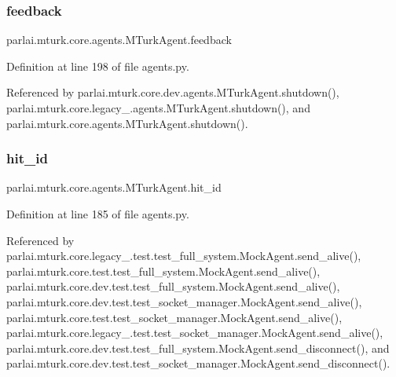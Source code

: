 \mbox{\label{classparlai_1_1mturk_1_1core_1_1agents_1_1MTurkAgent_afc4c17ac00ca8efec5cc2cb6aea88765}} 
\subsubsection{\texorpdfstring{feedback}{feedback}}
{\footnotesize\ttfamily parlai.\+mturk.\+core.\+agents.\+M\+Turk\+Agent.\+feedback}



Definition at line 198 of file agents.\+py.



Referenced by parlai.\+mturk.\+core.\+dev.\+agents.\+M\+Turk\+Agent.\+shutdown(), parlai.\+mturk.\+core.\+legacy\+\_.\+agents.\+M\+Turk\+Agent.\+shutdown(), and parlai.\+mturk.\+core.\+agents.\+M\+Turk\+Agent.\+shutdown().

\mbox{\label{classparlai_1_1mturk_1_1core_1_1agents_1_1MTurkAgent_a4325d1370d25335d4a7ad279d7d0c615}} 
\subsubsection{\texorpdfstring{hit\+\_\+id}{hit\_id}}
{\footnotesize\ttfamily parlai.\+mturk.\+core.\+agents.\+M\+Turk\+Agent.\+hit\+\_\+id}



Definition at line 185 of file agents.\+py.



Referenced by parlai.\+mturk.\+core.\+legacy\+\_.\+test.\+test\+\_\+full\+\_\+system.\+Mock\+Agent.\+send\+\_\+alive(), parlai.\+mturk.\+core.\+test.\+test\+\_\+full\+\_\+system.\+Mock\+Agent.\+send\+\_\+alive(), parlai.\+mturk.\+core.\+dev.\+test.\+test\+\_\+full\+\_\+system.\+Mock\+Agent.\+send\+\_\+alive(), parlai.\+mturk.\+core.\+dev.\+test.\+test\+\_\+socket\+\_\+manager.\+Mock\+Agent.\+send\+\_\+alive(), parlai.\+mturk.\+core.\+test.\+test\+\_\+socket\+\_\+manager.\+Mock\+Agent.\+send\+\_\+alive(), parlai.\+mturk.\+core.\+legacy\+\_.\+test.\+test\+\_\+socket\+\_\+manager.\+Mock\+Agent.\+send\+\_\+alive(), parlai.\+mturk.\+core.\+dev.\+test.\+test\+\_\+full\+\_\+system.\+Mock\+Agent.\+send\+\_\+disconnect(), and parlai.\+mturk.\+core.\+dev.\+test.\+test\+\_\+socket\+\_\+manager.\+Mock\+Agent.\+send\+\_\+disconnect().

